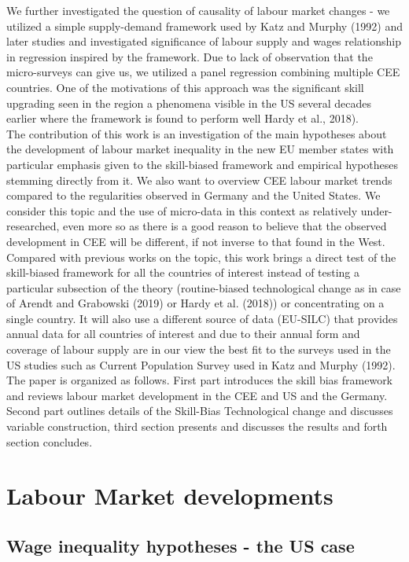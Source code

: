 \documentclass{article}
\begin{document}
We further investigated the question of causality of labour market changes - we utilized a simple supply-demand framework used by Katz and Murphy (1992) and later studies and investigated significance of labour supply and wages relationship in regression inspired by the framework. Due to lack of observation that the micro-surveys can give us, we utilized a panel regression combining multiple CEE countries. One of the motivations of this approach was the significant skill upgrading seen in the region a phenomena visible in the US several decades earlier where the framework is found to perform well Hardy et al., 2018).
\\
The contribution of this work is an investigation of the main hypotheses about the development of labour market inequality in the new EU member states with particular emphasis given to the skill-biased framework and empirical hypotheses stemming directly from it. We also want to overview CEE labour market trends compared to the regularities observed in Germany and the United States. We consider this topic and the use of micro-data in this context as relatively under-researched, even more so as there is a good reason to believe that the observed development in CEE will be different, if not inverse to that found in the West. Compared with previous works on the topic, this work brings a direct test of the skill-biased framework for all the countries of interest instead of testing a particular subsection of the theory (routine-biased technological change as in case of Arendt and Grabowski (2019) or Hardy et al. (2018)) or concentrating on a single country. It will also use a different source of data (EU-SILC) that provides annual data for all countries of interest and due to their annual form and coverage of labour supply are in our view the best fit to the surveys used in the US studies such as Current Population Survey used in Katz and Murphy (1992). \\
The paper is organized as follows. First part introduces the skill bias framework and reviews labour market development in the CEE and US and the Germany. Second part outlines details of the Skill-Bias Technological change and discusses variable construction, third section presents and discusses the results and forth section concludes.

\section{Labour Market developments}
\subsection{Wage inequality hypotheses - the US case}
\end{document}
